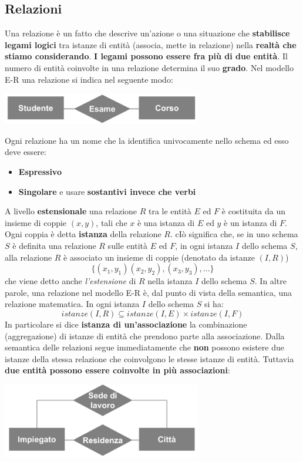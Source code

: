 \documentclass[12pt]{article}
\begin{document}
\subsection{Relazioni}
Una relazione è un fatto che descrive un'azione o una situazione che \textbf{stabilisce legami logici} tra istanze di entità (associa, mette in relazione) nella
\textbf{realtà che stiamo considerando}.
\textbf{I legami possono essere fra più di due entità}. Il numero di entità coinvolte in una relazione determina il suo \textbf{grado}.
Nel modello E-R una relazione si indica nel seguente modo:
\begin{center}
    \includegraphics[width = 0.65\textwidth]{Images/21.PNG}
\end{center}
Ogni relazione ha un nome che la identifica univocamente nello schema ed esso deve essere:
\begin{itemize}
    \item \textbf{Espressivo}
    \item \textbf{Singolare} e usare \textbf{sostantivi invece che verbi}
\end{itemize}
A livello \textbf{estensionale} una relazione $R$ tra le entità $E$ ed $F$ è costituita da un insieme di coppie $(x,y)$, tali che $x$ è una istanza di $E$ ed $y$ è un istanza di $F$.
Ogni coppia è detta \textbf{istanza} della relazione $R$.
cIò significa che, se in uno schema $S$ è definita una relazione $R$ sulle entità $E$ ed $F$, in ogni istanza $I$ dello schema $S$, alla relazione $R$ è associato un insieme di coppie
(denotato da istanze $(I, R)$)
$$\{(x_1, y_1) (x_2, y_2), (x_3, y_3), \dots\}$$
che viene detto anche \textit{l'estensione} di $R$ nella istanza $I$ dello schema $S$.
In altre parole, una relazione nel modello E-R è, dal punto di vista della semantica, una relazione matematica.
In ogni istanza $I$ dello schema $S$ si ha:
$$istanze(I, R) \subseteq istanze(I,E) \times istanze(I,F)$$
In particolare si dice \textbf{istanza di un'associazione} la combinazione (aggregazione) di istanze di entità che prendono parte alla associazione.
Dalla semantica delle relazioni segue immediatamente che \textbf{non} possono esistere due istanze della stessa relazione che coinvolgono le stesse istanze di entità.
\newpage
\noindent
Tuttavia \textbf{due entità possono essere coinvolte in più associazioni}:
\begin{center}
    \includegraphics[width = 0.65\textwidth]{Images/22.PNG}
\end{center}
\end{document}
